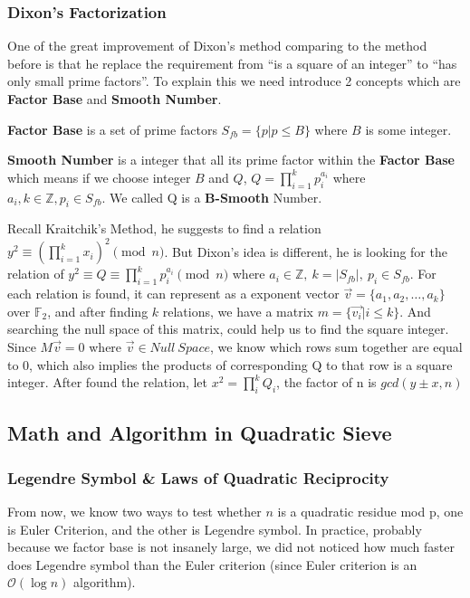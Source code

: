 \documentclass[12pt]{article} %
\begin{document}
\subsubsection {Dixon's Factorization}
One of the great improvement of Dixon's method comparing to the method before is that he replace the requirement from ``is a square of an integer'' to ``has only small prime factors''. To explain this we need introduce 2 concepts which are \textbf{Factor Base} and \textbf{Smooth Number}.

\textbf{Factor Base} is a set of prime factors $S_{fb}=\{p | p \le B\}$ where $B$ is some integer.

\textbf{Smooth Number} is a integer that all its prime factor within the \textbf{Factor Base} which means if we choose integer $B$ and $Q$, $Q = \prod_{i=1}^k{p_i^{a_i}}$ where $a_i, k \in \mathbb{Z}, p_i \in S_{fb}$. We called Q is a \textbf{B-Smooth} Number.

Recall Kraitchik's Method, he suggests to find a relation $y^2 \equiv \left (\prod_{i=1}^k{x_i}\right)^2 \pmod{n}$. But Dixon's idea is different, he is looking for the relation of $\displaystyle y^2 \equiv Q \equiv \prod_{i=1}^k{p_i^{a_i}} \pmod{n}$ where $a_i \in \mathbb{Z},\ k=|S_{fb}|,\ p_i \in S_{fb}$. For each relation is found, it can represent as a exponent vector $\vec{v} = \{a_1, a_2, \dots, a_k\}$ over $\mathbb{F}_{2}$, and after finding $k$ relations, we have a matrix $m = \{\vec{v_i} | i \le k\}$. And searching the null space of this matrix, could help us to find the square integer. Since $M\vec{v} = 0$ where $\vec{v} \in Null\ Space$, we know which rows sum together are equal to 0, which also implies the products of corresponding Q to that row is a square integer. After found the relation, let $x^2 = \prod_i^k{Q_i}$, the factor of n is $gcd(y\pm x, n)$

\subsection {Math and Algorithm in Quadratic Sieve}

\subsubsection{Legendre Symbol \& Laws of Quadratic Reciprocity}

From now, we know two ways to test whether $n$ is a quadratic residue mod p, one is Euler Criterion, and the other is Legendre symbol. In practice, probably because we factor base is not insanely large, we did not noticed how much faster does Legendre symbol than the Euler criterion (since Euler criterion is an $\mathcal{O}(\log{n}) $ algorithm).
\end{document}
